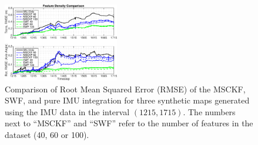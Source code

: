 \documentclass[letterpaper, 10 pt, conference]{ieeeconf}  %
\begin{document}
\begin{figure}
    \centering
    \includegraphics[width=0.45\textwidth]{figs/RMSE-Comparison-Feat-Density-1215-1715-Noisy}

    \caption{Comparison of Root Mean Squared Error (RMSE) of the MSCKF, SWF, and pure IMU integration for three synthetic maps generated using the IMU data in the interval $(1215,1715)$. The numbers next to ``MSCKF'' and ``SWF'' refer to the number of features in the dataset (40, 60 or 100).}
    \label{fig:comp_3}
\end{figure}
\end{document}

